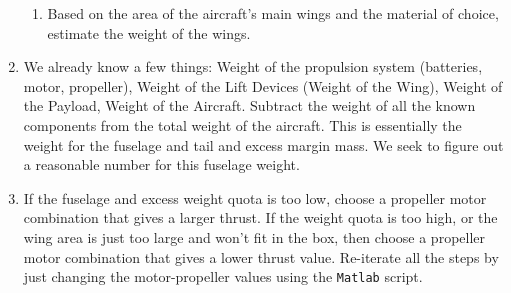 \documentclass[letter, 12pt]{article}
\begin{document}
\begin{center}
\begin{enumerate}
\begin{enumerate}
    \item Based on the area of the aircraft's main wings and the material of choice, estimate the weight of the wings.
    \end{enumerate}
\item We already know a few things: Weight of the propulsion system (batteries, motor, propeller), Weight of the Lift Devices (Weight of the Wing), Weight of the Payload, Weight of the Aircraft. Subtract the weight of all the known components from the total weight of the aircraft. This is essentially the weight for the fuselage and tail and excess margin mass. We seek to figure out a reasonable number for this fuselage weight.
\item If the fuselage and excess weight quota is too low, choose a propeller motor combination that gives a larger thrust. If the weight quota is too high, or the wing area is just too large and won't fit in the box, then choose a propeller motor combination that gives a lower thrust value. Re-iterate all the steps by just changing the motor-propeller values using the \texttt{Matlab} script.
\end{enumerate}


\end{center}
\end{document}
